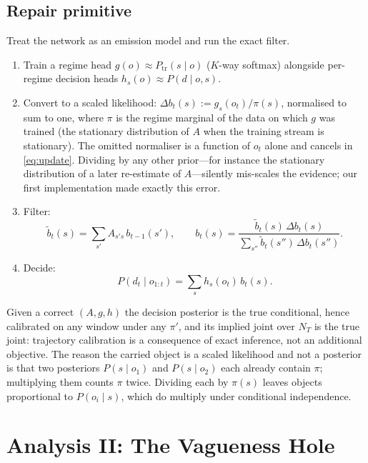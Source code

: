 \documentclass[11pt,a4paper]{article}
\numberwithin{equation}{section}
\theoremstyle{plain}
\theoremstyle{definition}
\theoremstyle{remark}
\newcommand{\ptrain}{P_{\mathrm{tr}}}
\begin{document}
\subsection{Repair primitive}\label{sec:repair1}

Treat the network as an emission model and run the exact filter.
\begin{enumerate}[leftmargin=2em]
\item Train a regime head $g(o)\approx\ptrain(s\mid o)$ ($K$-way softmax) alongside per-regime decision heads $h_s(o)\approx P(d\mid o,s)$.
\item Convert to a scaled likelihood: $\Delta b_t(s) := g_s(o_t)/\pi(s)$, normalised to sum to one, where $\pi$ is the regime marginal of the data on which $g$ was trained (the stationary distribution of $A$ when the training stream is stationary). The omitted normaliser is a function of $o_t$ alone and cancels in \eqref{eq:update}. Dividing by any other prior---for instance the stationary distribution of a later re-estimate of $A$---silently mis-scales the evidence; our first implementation made exactly this error.
\item Filter:
\begin{equation}\label{eq:update}
\tilde b_t(s) = \sum_{s'}A_{s's}\,b_{t-1}(s'),\qquad b_t(s) = \frac{\tilde b_t(s)\,\Delta b_t(s)}{\sum_{s''}\tilde b_t(s'')\,\Delta b_t(s'')} .
\end{equation}
\item Decide:
\begin{equation}\label{eq:decide}
P(d_t\mid o_{1:t}) = \sum_s h_s(o_t)\,b_t(s).
\end{equation}
\end{enumerate}
Given a correct $(A,g,h)$ the decision posterior is the true conditional, hence calibrated on any window under any $\pi'$, and its implied joint over $N_T$ is the true joint: trajectory calibration is a consequence of exact inference, not an additional objective. The reason the carried object is a scaled likelihood and not a posterior is that two posteriors $P(s\mid o_1)$ and $P(s\mid o_2)$ each already contain $\pi$; multiplying them counts $\pi$ twice. Dividing each by $\pi(s)$ leaves objects proportional to $P(o_i\mid s)$, which do multiply under conditional independence.

\section{Analysis II: The Vagueness Hole}\label{sec:vague}
\end{document}
